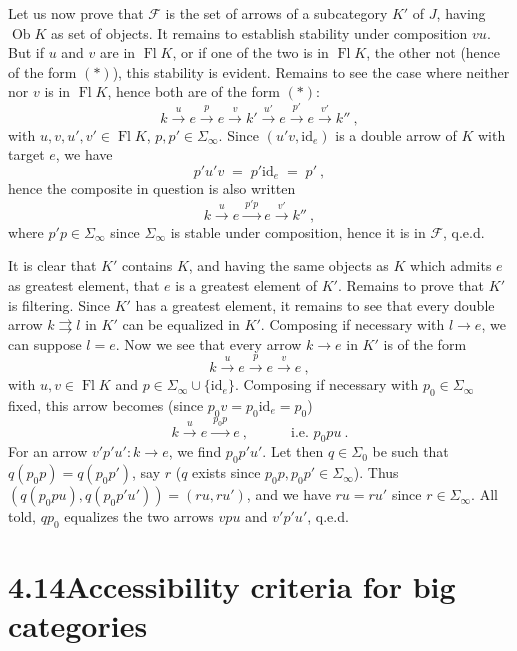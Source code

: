 \documentclass[11pt]{article}
\newcommand{\printedpage}[1]{\marginpar{\footnotesize p.~#1}}
\newcommand{\msp}[1]{\marginpar{\footnotesize [#1]}}
\newcommand{\Fl}{\operatorname{Fl}}
\newcommand{\Ob}{\operatorname{Ob}}
\newcommand{\id}{\mathrm{id}}
\begin{document}
Let us now prove that $\mathcal{F}$ is the set of arrows of a subcategory $K'$ of $J$, having $\Ob K$ as set of objects. It remains to establish stability under composition $vu$. But if $u$ and $v$ are in $\Fl K$, or if one of the two is in $\Fl K$, the other not (hence of the form $(*)$), this stability is evident. Remains to see the case where neither nor $v$ is in $\Fl K$, hence both are of the form $(*)$:
\[
k \xrightarrow{\ u\ } e \xrightarrow{\ p\ } e \xrightarrow{\ v\ } k' \xrightarrow{\ u'\ } e \xrightarrow{\ p'\ } e \xrightarrow{\ v'\ } k''\ ,
\]
with $u,v,u',v'\in\Fl K$, $p,p'\in\Sigma_\infty$. Since $(u'v,\id_e)$ is a double arrow of
\printedpage{140}
\msp{page 369}
$K$ with target $e$, we have
\[
p'u'v \;=\; p'\id_e \;=\; p'\ ,
\]
hence the composite in question is also written
\[
k \xrightarrow{\ u\ } e \xrightarrow{\ p'p\ } e \xrightarrow{\ v'\ } k''\ ,
\]
where $p'p\in\Sigma_\infty$ since $\Sigma_\infty$ is stable under composition, hence it is in $\mathcal{F}$, q.e.d.

It is clear that $K'$ contains $K$, and having the same objects as $K$ which admits $e$ as greatest element, that $e$ is a greatest element of $K'$. Remains to prove that $K'$ is filtering. Since $K'$ has a greatest element, it remains to see that every double arrow $k\rightrightarrows l$ in $K'$ can be equalized in $K'$. Composing if necessary with $l\longrightarrow e$, we can suppose $l=e$. Now we see that every arrow $k\longrightarrow e$ in $K'$ is of the form
\[
k \xrightarrow{\ u\ } e \xrightarrow{\ p\ } e \xrightarrow{\ v\ } e\ ,
\]
with $u,v\in\Fl K$ and $p\in\Sigma_\infty\cup\{\id_e\}$. Composing if necessary with $p_0\in\Sigma_\infty$ fixed, this arrow becomes (since $p_0v=p_0\id_e=p_0$)
\[
k \xrightarrow{\ u\ } e \xrightarrow{\ p_0p\ } e\ , \qquad\quad \text{i.e. } p_0pu\ .
\]
For an arrow $v'p'u' : k\longrightarrow e$, we find $p_0p'u'$. Let then $q\in\Sigma_0$ be such that $q(p_0p)=q(p_0p')$, say $r$ ($q$ exists since $p_0p,p_0p'\in\Sigma_\infty$). Thus $(q(p_0pu),q(p_0p'u'))=(ru,ru')$, and we have $ru=ru'$ since $r\in\Sigma_\infty$. All told, $qp_0$ equalizes the two arrows $vpu$ and $v'p'u'$, q.e.d.

\msp{page 370}

\section*{4.14\quad Accessibility criteria for big categories}
\end{document}
